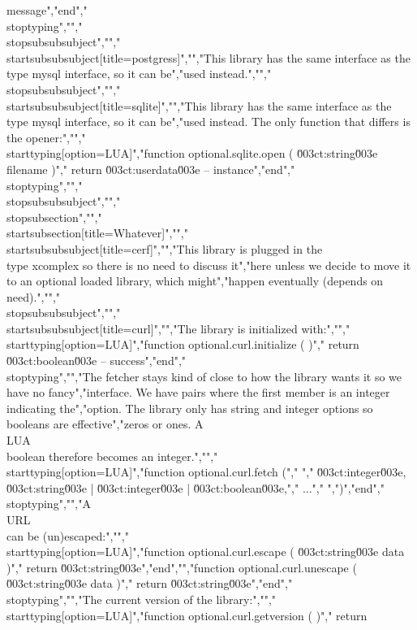 message","end","\\stoptyping","","\\stopsubsubsubject","","\\startsubsubsubject[title=postgress]","","This library has the same interface as the \\type {mysql} interface, so it can be","used instead.","","\\stopsubsubsubject","","\\startsubsubsubject[title=sqlite]","","This library has the same interface as the \\type {mysql} interface, so it can be","used instead. The only function that differs is the opener:","","\\starttyping[option=LUA]","function optional.sqlite.open ( \u003ct:string\u003e filename )","    return \u003ct:userdata\u003e -- instance","end","\\stoptyping","","\\stopsubsubsubject","","\\stopsubsection","","\\startsubsection[title=Whatever]","","\\startsubsubsubject[title=cerf]","","This library is plugged in the \\type {xcomplex} so there is no need to discuss it","here unless we decide to move it to an optional loaded library, which might","happen eventually (depends on need).","","\\stopsubsubsubject","","\\startsubsubsubject[title=curl]","","The library is initialized with:","","\\starttyping[option=LUA]","function optional.curl.initialize ( )","    return \u003ct:boolean\u003e -- success","end","\\stoptyping","","The fetcher stays kind of close to how the library wants it so we have no fancy","interface. We have pairs where the first member is an integer indicating the","option. The library only has string and integer options so booleans are effective","zeros or ones. A \\LUA\\ boolean therefore becomes an integer.","","\\starttyping[option=LUA]","function optional.curl.fetch (","    {","        \u003ct:integer\u003e, \u003ct:string\u003e | \u003ct:integer\u003e | \u003ct:boolean\u003e,","        ...","    }",")","end","\\stoptyping","","A \\URL\\ can be (un)escaped:","","\\starttyping[option=LUA]","function optional.curl.escape ( \u003ct:string\u003e data )","    return \u003ct:string\u003e","end","","function optional.curl.unescape ( \u003ct:string\u003e data )","    return \u003ct:string\u003e","end","\\stoptyping","","The current version of the library:","","\\starttyping[option=LUA]","function optional.curl.getversion ( )","    return 